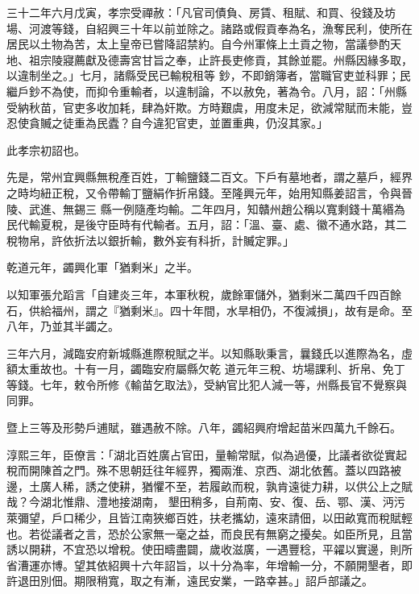 \begin{pinyinscope}
 三十二年六月戊寅，孝宗受禪赦：「凡官司債負、房賃、租賦、和買、役錢及坊場、河渡等錢，自紹興三十年以前並除之。諸路或假貢奉為名，漁奪民利，使所在居民以土物為苦，太上皇帝已嘗降詔禁約。自今州軍條上土貢之物，當議參酌天地、祖宗陵寢薦獻及德壽宮甘旨之奉，止許長吏修貢，其餘並罷。州縣因緣多取，以違制坐之。」七月，諸縣受民已輸稅租等
 鈔，不即銷簿者，當職官吏並科罪；民繼戶鈔不為使，而抑令重輸者，以違制論，不以赦免，著為令。八月，詔：「州縣受納秋苗，官吏多收加耗，肆為奸欺。方時艱虞，用度未足，欲減常賦而未能，豈忍使貪贓之徒重為民蠹？自今違犯官吏，並置重典，仍沒其家。」



 此孝宗初詔也。



 先是，常州宜興縣無稅產百姓，丁輸鹽錢二百文。下戶有墓地者，謂之墓戶，經界之時均紐正稅，又令帶輸丁鹽絹作折帛錢。至隆興元年，始用知縣姜詔言，令與晉陵、武進、無錫三
 縣一例隨產均輸。二年四月，知贛州趙公稱以寬剩錢十萬緡為民代輸夏稅，是後守臣時有代輸者。五月，詔：「溫、臺、處、徽不通水路，其二稅物帛，許依折法以銀折輸，數外妄有科折，計贓定罪。」



 乾道元年，蠲興化軍「猶剩米」之半。



 以知軍張允蹈言「自建炎三年，本軍秋稅，歲餘軍儲外，猶剩米二萬四千四百餘石，供給福州，謂之『猶剩米』。四十年間，水旱相仍，不復減損」，故有是命。至八年，乃並其半蠲之。



 三年六月，減臨安府新城縣進際稅賦之半。以知縣耿秉言，曩錢氏以進際為名，虛額太重故也。十有一月，蠲臨安府屬縣欠乾
 道元年三稅、坊場課利、折帛、免丁等錢。七年，敕令所修《輸苗乞取法》，受納官比犯人減一等，州縣長官不覺察與同罪。



 暨上三等及形勢戶逋賦，雖遇赦不除。八年，蠲紹興府增起苗米四萬九千餘石。



 淳熙三年，臣僚言：「湖北百姓廣占官田，量輸常賦，似為過優，比議者欲從實起稅而開陳首之門。殊不思朝廷往年經界，獨兩淮、京西、湖北依舊。蓋以四路被邊，土廣人稀，誘之使耕，猶懼不至，若履畝而稅，孰肯遠徙力耕，以供公上之賦哉？今湖北惟鼎、澧地接湖南，
 墾田稍多，自荊南、安、復、岳、鄂、漢、沔污萊彌望，戶口稀少，且皆江南狹鄉百姓，扶老攜幼，遠來請佃，以田畝寬而稅賦輕也。若從議者之言，恐於公家無一毫之益，而良民有無窮之擾矣。如臣所見，且當誘以開耕，不宜恐以增稅。使田疇盡闢，歲收滋廣，一遇豐稔，平糴以實邊，則所省漕運亦博。望其依紹興十六年詔旨，以十分為率，年增輸一分，不願開墾者，即許退田別佃。期限稍寬，取之有漸，遠民安業，一路幸甚。」詔戶部議之。




\end{pinyinscope}
